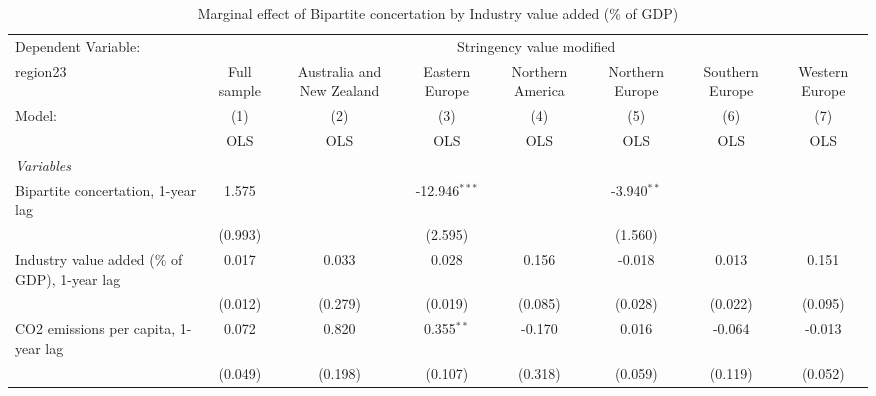 
\begin{table}[htbp]
   \caption{Marginal effect of Bipartite concertation by Industry value added (\% of GDP)}
   \centering
   \begin{tabular}{lccccccc}
      \toprule
      Dependent Variable: & \multicolumn{7}{c}{Stringency value modified}\\
      region23                                                                           & Full sample   & Australia and New Zealand & Eastern Europe  & Northern America & Northern Europe & Southern Europe & Western Europe \\   
      Model:                                                                             & (1)           & (2)                       & (3)             & (4)              & (5)             & (6)             & (7)\\  
                                                                                         &  OLS          & OLS                       & OLS             & OLS              & OLS             & OLS             & OLS\\  
      \midrule
      \emph{Variables}\\
      Bipartite concertation, 1-year lag                                                 & 1.575         &                           & -12.946$^{***}$ &                  & -3.940$^{**}$   &                 &   \\   
                                                                                         & (0.993)       &                           & (2.595)         &                  & (1.560)         &                 &   \\   
      Industry value added (\% of GDP), 1-year lag                                       & 0.017         & 0.033                     & 0.028           & 0.156            & -0.018          & 0.013           & 0.151\\   
                                                                                         & (0.012)       & (0.279)                   & (0.019)         & (0.085)          & (0.028)         & (0.022)         & (0.095)\\   
      CO2 emissions per capita, 1-year lag                                               & 0.072         & 0.820                     & 0.355$^{**}$    & -0.170           & 0.016           & -0.064          & -0.013\\   
                                                                                         & (0.049)       & (0.198)                   & (0.107)         & (0.318)          & (0.059)         & (0.119)         & (0.052)\\   

\end{tabular}
\end{table}
